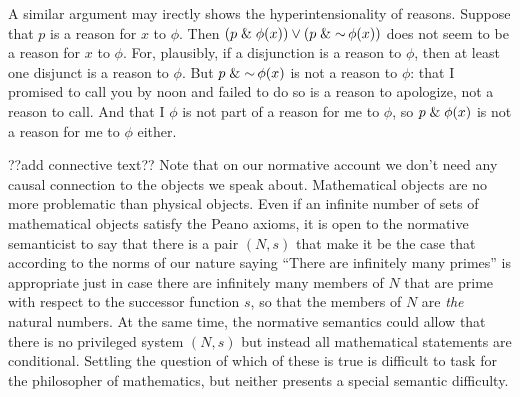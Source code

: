 A similar argument may irectly shows the hyperintensionality of reasons. Suppose that $p$ is a reason for $x$ to $\phi$. Then 
$(p\mathrel{\&} \phi(x))\vee (p\mathrel{\&} \operatorname{\sim}\phi(x))$ does not seem to be a reason for $x$ to $\phi$. For, plausibly, if a disjunction is a 
reason to $\phi$, then at least one disjunct is a reason to $\phi$. But $p\mathrel{\&} \operatorname{\sim}\phi(x)$ is not a reason to $\phi$: that I
promised to call you by noon and failed to do so is a reason to apologize, not a reason to call. And that I $\phi$ is not 
part of a reason for me to $\phi$, so $p\mathrel{\&}\phi(x)$ is not a reason for me to $\phi$ either.

??add connective text??
Note that on our normative account we don't need any causal connection to the objects we speak about. Mathematical objects
are no more problematic than physical objects. Even if an infinite number of sets of mathematical objects satisfy the Peano axioms, it is open 
to the normative semanticist to say that there is a pair $(N,s)$ that make it be the case that according to the norms of our nature
saying ``There are infinitely many primes'' is appropriate just in case there are infinitely many members of $N$ that are prime
with respect to the successor function $s$, so that the members of $N$ are \textit{the} natural numbers. At the same time, the
normative semantics could allow that there is no privileged system $(N,s)$ but instead all mathematical statements are conditional.
Settling the question of which of these is true is difficult to task for the philosopher of mathematics, but neither presents a 
special semantic difficulty.


